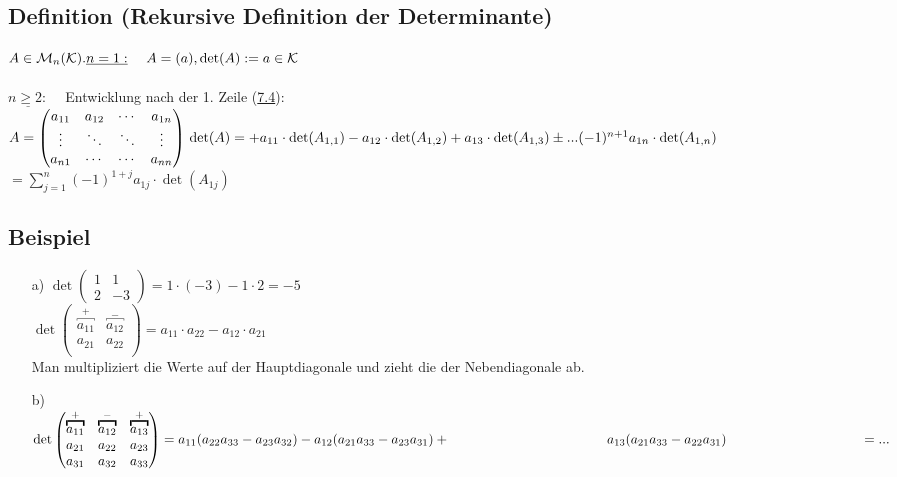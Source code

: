 \documentclass[a4paper, 12pt,titlepage, pdf, headsepline]{scrartcl}
\newcommand{\K}{\mathcal{K}}
\newcommand{\M}{\mathcal{M}}
\renewcommand{\>}{\rightarrow}
\renewcommand{\*}{\cdot}
\begin{document}
\subsection{Definition (Rekursive Definition der Determinante)}
\label{8.2}
$A \in \M_n(\K).\\
\\
\underline{n = 1:} ~~~~A = (a), \det(A) := a \in \K$\\
\\
$\underline{n \geq 2:}~~~~$ Entwicklung nach der 1. Zeile (\hyperref[7.4]{7.4}): \\

$A = \begin{pmatrix}
a_{11} & a_{12} & \cdots & a_{1n} \\
\vdots & \ddots &\ddots & \vdots \\
a_{n1} & \cdots & \cdots & a_{nn} \\
\end{pmatrix}\\ 
\\
\det(A) =+a_{11}\cdot \det(A_{1,1})- a_{12}\cdot \det(A_{1,2}) + a_{13}\cdot \det(A_{1,3}) \pm ... (-1)^{n+1}a_{1n}\cdot \det(A_{1,n})$
\noindent\hspace*{12mm}$= \sum_{j = 1}^{n} (-1)^{1+j} a_{1j} \cdot \det(A_{1j})$
\subsection{Beispiel}
\begin{itemize}
	\item[a)] $\det\begin{pmatrix}
	1 & 1 \\
	2 & -3
	\end{pmatrix} = 1 \cdot (-3) - 1 \cdot 2 = -5$\\
	$\det\begin{pmatrix}
	\overbracket{a_{11}}^{+} & \overbracket{a_{12}}^{-} \\
	a_{21} & a_{22} \\
	\end{pmatrix} = a_{11} \cdot a_{22} - a_{12} \cdot a_{21}$  \\
	 Man multipliziert die Werte auf der Hauptdiagonale und zieht die der Nebendiagonale ab.
	\item[b)] $\det\begin{pmatrix}
	\overbracket{a_{11}}^{+} &\overbracket{a_{12}}^{-} & \overbracket{a_{13}}^{+} \\
	a_{21} &a_{22} & a_{23} \\
	a_{31} &a_{32} & a_{33} \\
	\end{pmatrix} = a_{11}(a_{22}a_{33} - a_{23}a_{32}) - a_{12}(a_{21}a_{33} - a_{23}a_{31}) + \\
	\noindent\hspace*{41mm}a_{13}(a_{21}a_{33} - a_{22}a_{31}) \\\noindent\hspace*{35mm}= ...$\\
\end{itemize}
\end{document}

